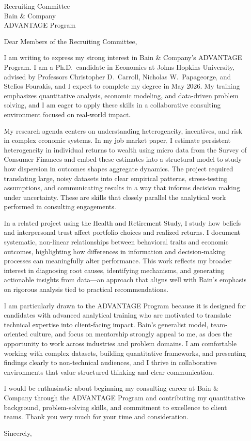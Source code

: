 \documentclass[11pt,letterpaper]{letter}
\begin{document}
\begin{letter}{
Recruiting Committee \\
Bain \& Company \\
ADVANTAGE Program
}

\opening{Dear Members of the Recruiting Committee,}

I am writing to express my strong interest in Bain \& Company’s ADVANTAGE Program. I am a Ph.D.\ candidate in Economics at Johns Hopkins University, advised by Professors Christopher D.~Carroll, Nicholas W.~Papageorge, and Stelios Fourakis, and I expect to complete my degree in May 2026. My training emphasizes quantitative analysis, economic modeling, and data-driven problem solving, and I am eager to apply these skills in a collaborative consulting environment focused on real-world impact.

My research agenda centers on understanding heterogeneity, incentives, and risk in complex economic systems. In my job market paper, I estimate persistent heterogeneity in individual returns to wealth using micro data from the Survey of Consumer Finances and embed these estimates into a structural model to study how dispersion in outcomes shapes aggregate dynamics. The project required translating large, noisy datasets into clear empirical patterns, stress-testing assumptions, and communicating results in a way that informs decision making under uncertainty. These are skills that closely parallel the analytical work performed in consulting engagements.

In a related project using the Health and Retirement Study, I study how beliefs and interpersonal trust affect portfolio choices and realized returns. I document systematic, non-linear relationships between behavioral traits and economic outcomes, highlighting how differences in information and decision-making processes can meaningfully alter performance. This work reflects my broader interest in diagnosing root causes, identifying mechanisms, and generating actionable insights from data—an approach that aligns well with Bain’s emphasis on rigorous analysis tied to practical recommendations.

I am particularly drawn to the ADVANTAGE Program because it is designed for candidates with advanced analytical training who are motivated to translate technical expertise into client-facing impact. Bain’s generalist model, team-oriented culture, and focus on mentorship strongly appeal to me, as does the opportunity to work across industries and problem domains. I am comfortable working with complex datasets, building quantitative frameworks, and presenting findings clearly to non-technical audiences, and I thrive in collaborative environments that value structured thinking and clear communication.

I would be enthusiastic about beginning my consulting career at Bain \& Company through the ADVANTAGE Program and contributing my quantitative background, problem-solving skills, and commitment to excellence to client teams. Thank you very much for your time and consideration.

\closing{Sincerely,}

\end{letter}
\end{document}

